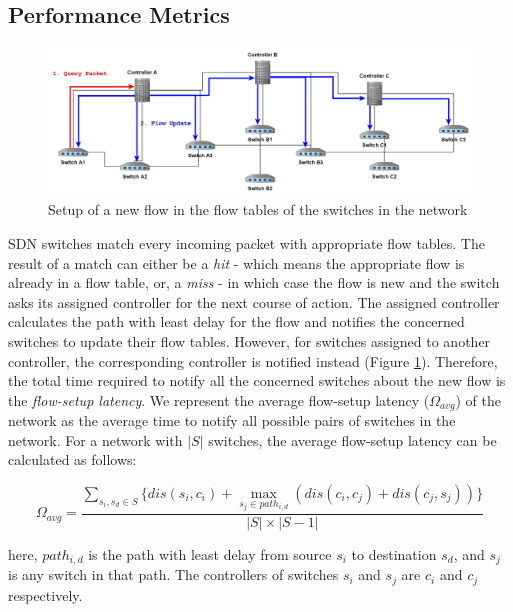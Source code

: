 \documentclass[preprint,12pt]{elsarticle}
\begin{document}
	\subsection{Performance Metrics} \label{PerfMetrics}
	
	\begin{figure}
		\centering
		\includegraphics[width=\textwidth]{Images/new_flow.jpg}
		\caption{Setup of a new flow in the flow tables of the switches in the network} \label{new_flow}
	\end{figure}
	
	SDN switches match every incoming packet with appropriate flow tables. The result of a match can either be a \textit{hit} - which means the appropriate flow is already in a flow table, or, a \textit{miss} - in which case the flow is new and the switch asks its assigned controller for the next course of action. The assigned controller calculates the path with least delay for the flow and notifies the concerned switches to update their flow tables. However, for switches assigned to another controller, the corresponding controller is notified instead (Figure \ref{new_flow}). Therefore, the total time required to notify all the concerned switches about the new flow is the \textit{flow-setup latency}. We represent the average flow-setup latency ($\Omega_{avg}$) of the network as the average time to notify all possible pairs of switches in the network. For a network with $|S|$ switches, the average flow-setup latency can be calculated as follows:
	
	\begin{equation} \label{eqn:setupLatency}
	\Omega_{avg} = \frac{\sum_{s_i,s_d\in S} \{dis(s_i,c_i)+\max_{s_j\in path_{i,d}}\left(dis(c_i,c_j)+dis(c_j,s_j) \right) \}}{|S|\times |S-1|}
	\end{equation}
	
	here, $path_{i,d}$ is the path with least delay from source $s_i$ to destination $s_d$, and $s_j$ is any switch in that path. The controllers of switches $s_i$ and $s_j$ are $c_i$ and $c_j$ respectively.
	
\end{document}
